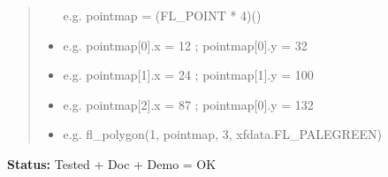 \begin{boxedminipage}{\funcwidth}
\begin{quote}
\begin{itemize}
e.g. pointmap = (FL\_POINT * 4)()


  \item 
e.g. pointmap{[}0{]}.x = 12 ; pointmap{[}0{]}.y = 32


  \item 
e.g. pointmap{[}1{]}.x = 24 ; pointmap{[}1{]}.y = 100


  \item 
e.g. pointmap{[}2{]}.x = 87 ; pointmap{[}0{]}.y = 132


  \item 
e.g. fl\_polygon(1, pointmap, 3, xfdata.FL\_PALEGREEN)


\end{itemize}

\end{quote}

\textbf{Status:} 
Tested + Doc + Demo = OK


    \end{boxedminipage}

    \label{xformslib:flxbasic:fl_polyf}

    \vspace{0.5ex}

